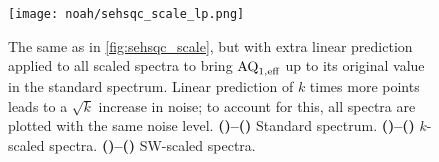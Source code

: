 \begin{figure}[!htbp]
    \centering
    \texttt{[image: noah/sehsqc\_scale\_lp.png]}%
    {\label{fig:sehsqc_scale_lp_std2}}%
    {\label{fig:sehsqc_scale_lp_std1}}%
    {\label{fig:sehsqc_scale_lp_k22}}%
    {\label{fig:sehsqc_scale_lp_k21}}%
    {\label{fig:sehsqc_scale_lp_k42}}%
    {\label{fig:sehsqc_scale_lp_k41}}%
    {\label{fig:sehsqc_scale_lp_k82}}%
    {\label{fig:sehsqc_scale_lp_k81}}%
    {\label{fig:sehsqc_scale_lp_sw22}}%
    {\label{fig:sehsqc_scale_lp_sw21}}%
    {\label{fig:sehsqc_scale_lp_sw42}}%
    {\label{fig:sehsqc_scale_lp_sw41}}%
    {\label{fig:sehsqc_scale_lp_sw82}}%
    {\label{fig:sehsqc_scale_lp_sw81}}%
    \caption[Effects of $k$- and SW-scaling on NOAH seHSQC2 spectrum with extra linear prediction]{
        The same as in \cref{fig:sehsqc_scale}, but with extra linear prediction applied to all scaled spectra to bring $\text{AQ}_{1,\text{eff}}$ up to its original value in the standard spectrum.
        Linear prediction of $k$ times more points leads to a $\sqrt{k}$ increase in noise; to account for this, all spectra are plotted with the same noise level.
        \textbf{()--()} Standard spectrum.
        \textbf{()--()} $k$-scaled spectra.
        \textbf{()--()} SW-scaled spectra.
    }
    \label{fig:sehsqc_scale_lp}
\end{figure}
